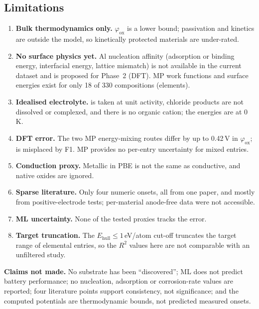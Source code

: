 \documentclass{report}
\newcommand{\phiox}{\varphi_{\mathrm{ox}}}
\newcommand{\Ehull}{E_{\mathrm{hull}}}
\begin{document}
\subsection{Limitations}
\begin{enumerate}[leftmargin=*,itemsep=2pt]
\item \textbf{Bulk thermodynamics only.} $\phiox$ is a lower bound; passivation and kinetics are outside the model, so kinetically protected materials are under-rated.
\item \textbf{No surface physics yet.} Al nucleation affinity (adsorption or binding energy, interfacial energy, lattice mismatch) is not available in the current dataset and is proposed for Phase~2 (DFT). MP work functions and surface energies exist for only 18 of 330 compositions (elements).
\item \textbf{Idealised electrolyte.}  is taken at unit activity, chloride products are not dissolved or complexed, and there is no organic cation; the energies are at 0\,K.
\item \textbf{DFT error.} The two MP energy-mixing routes differ by up to 0.42\,V in $\phiox$;  is misplaced by F1. MP provides no per-entry uncertainty for mixed entries.
\item \textbf{Conduction proxy.} Metallic in PBE is not the same as conductive, and native oxides are ignored.
\item \textbf{Sparse literature.} Only four numeric onsets, all from one paper, and mostly from positive-electrode tests; per-material anode-free data were not accessible.
\item \textbf{ML uncertainty.} None of the tested proxies tracks the error.
\item \textbf{Target truncation.} The $\Ehull \le 1$\,eV/atom cut-off truncates the target range of elemental entries, so the $R^2$ values here are not comparable with an unfiltered study.
\end{enumerate}

\noindent\textbf{Claims not made.} No substrate has been ``discovered''; ML does not predict battery performance; no nucleation, adsorption or corrosion-rate values are reported; four literature points support consistency, not significance; and the computed potentials are thermodynamic bounds, not predicted measured onsets.

\pagebreak
\end{document}
